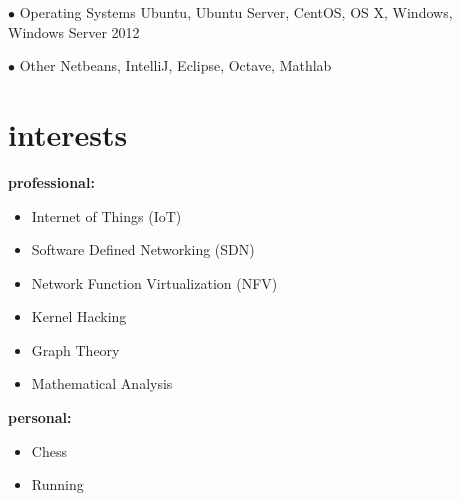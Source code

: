 \documentclass[]{friggeri-cv} %
\begin{document}

\entry
{$\bullet$}
{Operating Systems}
{}
{Ubuntu, Ubuntu Server, CentOS, OS X, Windows, Windows Server 2012}


\entry
{$\bullet$}
{Other}
{}
{Netbeans, IntelliJ, Eclipse, Octave, Mathlab}



\section{interests}
\textbf{professional:}
\begin{itemize}
	\item Internet of Things (IoT)
	\item Software Defined Networking (SDN)
	\item Network Function Virtualization (NFV)
	\item Kernel Hacking
	\item Graph Theory
	\item Mathematical Analysis
\end{itemize}
\textbf{personal:}
\begin{itemize}	
	\item Chess
	\item Running
\end{itemize}
\end{document}
